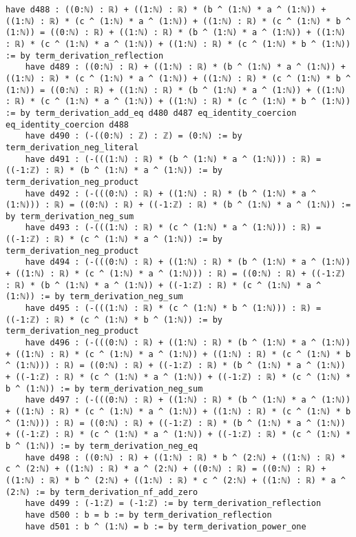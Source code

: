 \documentclass{article}
\begin{document}
\begin{tcolorbox}[colback=white!10, width=\linewidth]
\begin{lstlisting}[language=Lean4]
    have d488 : ((0:ℕ) : ℝ) + ((1:ℕ) : ℝ) * (b ^ (1:ℕ) * a ^ (1:ℕ)) + ((1:ℕ) : ℝ) * (c ^ (1:ℕ) * a ^ (1:ℕ)) + ((1:ℕ) : ℝ) * (c ^ (1:ℕ) * b ^ (1:ℕ)) = ((0:ℕ) : ℝ) + ((1:ℕ) : ℝ) * (b ^ (1:ℕ) * a ^ (1:ℕ)) + ((1:ℕ) : ℝ) * (c ^ (1:ℕ) * a ^ (1:ℕ)) + ((1:ℕ) : ℝ) * (c ^ (1:ℕ) * b ^ (1:ℕ)) := by term_derivation_reflection
    have d489 : ((0:ℕ) : ℝ) + ((1:ℕ) : ℝ) * (b ^ (1:ℕ) * a ^ (1:ℕ)) + ((1:ℕ) : ℝ) * (c ^ (1:ℕ) * a ^ (1:ℕ)) + ((1:ℕ) : ℝ) * (c ^ (1:ℕ) * b ^ (1:ℕ)) = ((0:ℕ) : ℝ) + ((1:ℕ) : ℝ) * (b ^ (1:ℕ) * a ^ (1:ℕ)) + ((1:ℕ) : ℝ) * (c ^ (1:ℕ) * a ^ (1:ℕ)) + ((1:ℕ) : ℝ) * (c ^ (1:ℕ) * b ^ (1:ℕ)) := by term_derivation_add_eq d480 d487 eq_identity_coercion eq_identity_coercion d488
    have d490 : (-((0:ℕ) : ℤ) : ℤ) = (0:ℕ) := by term_derivation_neg_literal
    have d491 : (-(((1:ℕ) : ℝ) * (b ^ (1:ℕ) * a ^ (1:ℕ))) : ℝ) = ((-1:ℤ) : ℝ) * (b ^ (1:ℕ) * a ^ (1:ℕ)) := by term_derivation_neg_product
    have d492 : (-(((0:ℕ) : ℝ) + ((1:ℕ) : ℝ) * (b ^ (1:ℕ) * a ^ (1:ℕ))) : ℝ) = ((0:ℕ) : ℝ) + ((-1:ℤ) : ℝ) * (b ^ (1:ℕ) * a ^ (1:ℕ)) := by term_derivation_neg_sum
    have d493 : (-(((1:ℕ) : ℝ) * (c ^ (1:ℕ) * a ^ (1:ℕ))) : ℝ) = ((-1:ℤ) : ℝ) * (c ^ (1:ℕ) * a ^ (1:ℕ)) := by term_derivation_neg_product
    have d494 : (-(((0:ℕ) : ℝ) + ((1:ℕ) : ℝ) * (b ^ (1:ℕ) * a ^ (1:ℕ)) + ((1:ℕ) : ℝ) * (c ^ (1:ℕ) * a ^ (1:ℕ))) : ℝ) = ((0:ℕ) : ℝ) + ((-1:ℤ) : ℝ) * (b ^ (1:ℕ) * a ^ (1:ℕ)) + ((-1:ℤ) : ℝ) * (c ^ (1:ℕ) * a ^ (1:ℕ)) := by term_derivation_neg_sum
    have d495 : (-(((1:ℕ) : ℝ) * (c ^ (1:ℕ) * b ^ (1:ℕ))) : ℝ) = ((-1:ℤ) : ℝ) * (c ^ (1:ℕ) * b ^ (1:ℕ)) := by term_derivation_neg_product
    have d496 : (-(((0:ℕ) : ℝ) + ((1:ℕ) : ℝ) * (b ^ (1:ℕ) * a ^ (1:ℕ)) + ((1:ℕ) : ℝ) * (c ^ (1:ℕ) * a ^ (1:ℕ)) + ((1:ℕ) : ℝ) * (c ^ (1:ℕ) * b ^ (1:ℕ))) : ℝ) = ((0:ℕ) : ℝ) + ((-1:ℤ) : ℝ) * (b ^ (1:ℕ) * a ^ (1:ℕ)) + ((-1:ℤ) : ℝ) * (c ^ (1:ℕ) * a ^ (1:ℕ)) + ((-1:ℤ) : ℝ) * (c ^ (1:ℕ) * b ^ (1:ℕ)) := by term_derivation_neg_sum
    have d497 : (-(((0:ℕ) : ℝ) + ((1:ℕ) : ℝ) * (b ^ (1:ℕ) * a ^ (1:ℕ)) + ((1:ℕ) : ℝ) * (c ^ (1:ℕ) * a ^ (1:ℕ)) + ((1:ℕ) : ℝ) * (c ^ (1:ℕ) * b ^ (1:ℕ))) : ℝ) = ((0:ℕ) : ℝ) + ((-1:ℤ) : ℝ) * (b ^ (1:ℕ) * a ^ (1:ℕ)) + ((-1:ℤ) : ℝ) * (c ^ (1:ℕ) * a ^ (1:ℕ)) + ((-1:ℤ) : ℝ) * (c ^ (1:ℕ) * b ^ (1:ℕ)) := by term_derivation_neg_eq
    have d498 : ((0:ℕ) : ℝ) + ((1:ℕ) : ℝ) * b ^ (2:ℕ) + ((1:ℕ) : ℝ) * c ^ (2:ℕ) + ((1:ℕ) : ℝ) * a ^ (2:ℕ) + ((0:ℕ) : ℝ) = ((0:ℕ) : ℝ) + ((1:ℕ) : ℝ) * b ^ (2:ℕ) + ((1:ℕ) : ℝ) * c ^ (2:ℕ) + ((1:ℕ) : ℝ) * a ^ (2:ℕ) := by term_derivation_nf_add_zero
    have d499 : (-1:ℤ) = (-1:ℤ) := by term_derivation_reflection
    have d500 : b = b := by term_derivation_reflection
    have d501 : b ^ (1:ℕ) = b := by term_derivation_power_one

\end{lstlisting}
\end{tcolorbox}
\end{document}
